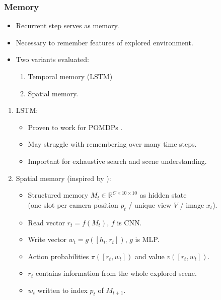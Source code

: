\begin{frame}
    \frametitle{Memory}

    \begin{itemize}
        \item Recurrent step serves as memory.
        \item Necessary to remember features of explored environment.
        \item Two variants evaluated:
        \begin{enumerate}
            \item Temporal memory (LSTM)
            \item Spatial memory.
        \end{enumerate}
    \end{itemize}
\end{frame}

\begin{frame}
    \begin{enumerate}
        \item LSTM:
        \begin{itemize}
            \item Proven to work for POMDPs \cite{hausknecht_deep_2017,mnih_asynchronous_2016,mirowski_learning_2017,gupta_cognitive_2019}.
            \item May struggle with remembering over many time steps.
            \item Important for exhaustive search and scene understanding.
        \end{itemize}
        \item Spatial memory (inspired by \cite{parisotto_neural_2017}):
        \begin{itemize}
            \item Structured memory \(M_t \in \mathbb{R}^{C \times 10 \times 10}\) as hidden state \\
            (one slot per camera position \(p_t\) / unique view \(V\) / image \(x_t\)).
            \item Read vector \(r_t = f(M_t)\), \(f\) is CNN.
            \item Write vector \(w_t = g(\left\lbrack h_t, r_t \right\rbrack)\), \(g\) is MLP.
            \item Action probabilities \(\pi(\left\lbrack r_t, w_t \right\rbrack)\) and value \(v(\left\lbrack r_t, w_t \right\rbrack)\).
            \item \(r_t\) contains information from the whole explored scene.
            \item \(w_t\) written to index \(p_t\) of \(M_{t+1}\).
        \end{itemize}
    \end{enumerate}
\end{frame}

